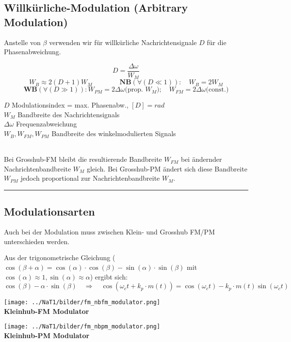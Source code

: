 \subsection{Willkürliche-Modulation (Arbitrary Modulation) }
Anstelle von $\beta$ verwenden wir für willkürliche Nachrichtensignale $D$ für die
Phasenabweichung.\\ 
\begin{minipage}[t][2.7cm][c]{10cm}
	$$ D = \frac{\Delta \omega}{W_M} $$	
$$W_B \approx 2(D + 1) W_M \qquad \qquad 
	\textbf{NB}(\forall (D \ll 1)): \quad W_{B} = 2 W_M $$
 $$ \textbf{WB} (\forall (D \gg 1)): W_{PM} = 2 \Delta \omega \text{(prop. $W_M$)};
 \quad W_{FM} = 2 \Delta \omega \text{(const.)} $$
\end{minipage} \hspace{0.6cm}
\begin{minipage}[t][2.7cm][c]{8cm} 
	$D$ Modulationsindex = max. Phasenabw., $[D] = rad$ \\
	$W_M$ Bandbreite des Nachrichtensignals \\
	$\Delta \omega$ Frequenzabweichung \\
	$W_B,W_{FM},W_{PM}$ Bandbreite des winkelmodulierten Signals
\end{minipage} \\
Bei Grosshub-FM bleibt die resultierende Bandbreite $W_{FM}$ bei ändernder Nachrichtenbandbreite
$W_M$ gleich. Bei Grosshub-PM ändert sich diese Bandbreite$W_{PM}$ jedoch proportional zur
Nachrichtenbandbreite $W_M$.\\

\hrule
\subsection{Modulationsarten}
Auch bei der Modulation muss zwischen Klein- und Grosshub FM/PM unterschieden werden.


Aus der trigonometrische Gleichung ($\cos(\beta + \alpha) = \cos(\alpha) \cdot \cos(\beta) -
\sin(\alpha) \cdot \sin(\beta)$ mit $\cos(\alpha) \approx 1, \sin(\alpha) \approx \alpha$) ergibt
sich: \\
$$\cos(\beta) - \alpha \cdot \sin(\beta) \quad \Rightarrow \quad \cos(\omega_c t + k_p \cdot m(t))
= \cos(\omega_c t) - k_p \cdot m(t) \sin(\omega_c t)$$

\begin{minipage}[t][3cm][c]{9cm}	
	\begin{center}
  		\texttt{[image: ../NaT1/bilder/fm\_nbfm\_modulator.png]} \\
  		\textbf{Kleinhub-FM Modulator}
	\end{center}
\end{minipage}
\begin{minipage}[t][3cm][c]{9cm} 
	\begin{center}
		\texttt{[image: ../NaT1/bilder/fm\_nbpm\_modulator.png]} \\ 
  		\textbf{Kleinhub-PM Modulator}
	\end{center}
\end{minipage}

